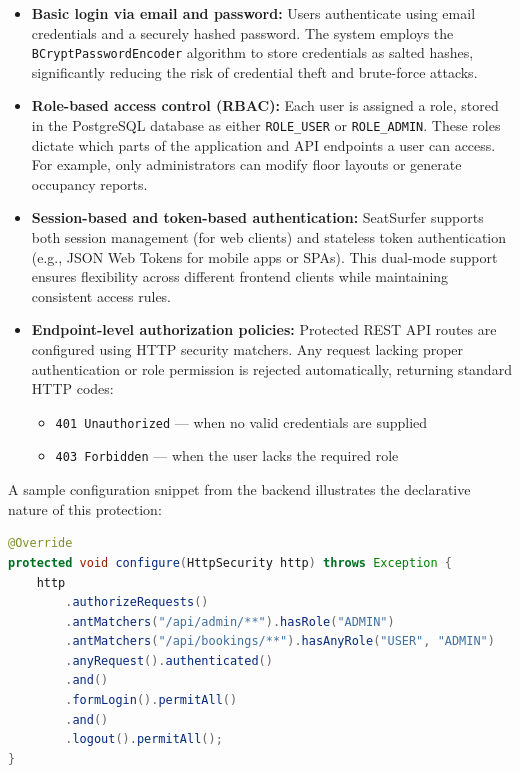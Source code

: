 \documentclass[12pt,a4paper]{report} %
\begin{document}
\begin{itemize}
    \item \textbf{Basic login via email and password:} Users authenticate using email credentials and a securely hashed password. The system employs the \texttt{BCryptPasswordEncoder} algorithm to store credentials as salted hashes, significantly reducing the risk of credential theft and brute-force attacks.

    \item \textbf{Role-based access control (RBAC):} Each user is assigned a role, stored in the PostgreSQL database as either \verb|ROLE_USER| or \verb|ROLE_ADMIN|. These roles dictate which parts of the application and API endpoints a user can access. For example, only administrators can modify floor layouts or generate occupancy reports.

    \item \textbf{Session-based and token-based authentication:} SeatSurfer supports both session management (for web clients) and stateless token authentication (e.g., JSON Web Tokens for mobile apps or SPAs). This dual-mode support ensures flexibility across different frontend clients while maintaining consistent access rules.

    \item \textbf{Endpoint-level authorization policies:} Protected REST API routes are configured using HTTP security matchers. Any request lacking proper authentication or role permission is rejected automatically, returning standard HTTP codes:
    \begin{itemize}
        \item \texttt{401 Unauthorized} — when no valid credentials are supplied
        \item \texttt{403 Forbidden} — when the user lacks the required role
    \end{itemize}
\end{itemize}

\noindent
A sample configuration snippet from the backend illustrates the declarative nature of this protection:

\begin{lstlisting}[language=Java, caption=Spring Security Configuration Snippet]
@Override
protected void configure(HttpSecurity http) throws Exception {
    http
        .authorizeRequests()
        .antMatchers("/api/admin/**").hasRole("ADMIN")
        .antMatchers("/api/bookings/**").hasAnyRole("USER", "ADMIN")
        .anyRequest().authenticated()
        .and()
        .formLogin().permitAll()
        .and()
        .logout().permitAll();
}
\end{lstlisting}
\end{document}
